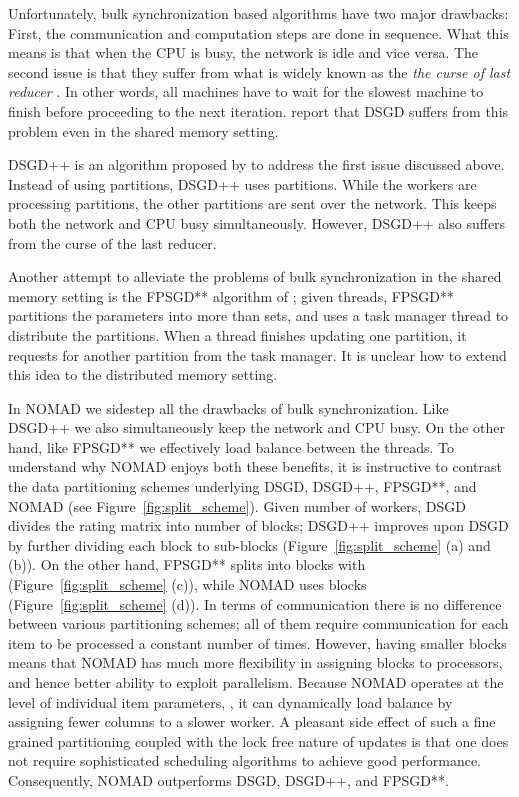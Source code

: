 \documentclass{vldb}
\begin{document}
Unfortunately, bulk synchronization based algorithms have two major
drawbacks: First, the communication and computation steps are done in
sequence. What this means is that when the CPU is busy, the network is
idle and vice versa. The second issue is that they suffer from what is
widely known as the \emph{the curse of last reducer}
\citep{SurVas11,AgaChaDudLan11}. In other words, all machines have to
wait for the slowest machine to finish before proceeding to the next
iteration. \citet{ZhuChiJuaLin13} report that DSGD suffers from this
problem even in the shared memory setting.

DSGD++ is an algorithm proposed by \citet{TefMakGem12} to address the
first issue discussed above. Instead of using  partitions, DSGD++
uses  partitions. While the  workers are processing 
partitions, the other  partitions are sent over the network. This
keeps both the network and CPU busy simultaneously. However, DSGD++
also suffers from the curse of the last reducer. 

Another attempt to alleviate the problems of bulk synchronization in the
shared memory setting is the FPSGD** algorithm of
\citet{ZhuChiJuaLin13}; given  threads, FPSGD** partitions the
parameters into more than  sets, and uses a task manager thread to
distribute the partitions. When a thread finishes updating one
partition, it requests for another partition from the task manager. It
is unclear how to extend this idea to the distributed memory setting.

In NOMAD we sidestep all the drawbacks of bulk synchronization. Like
DSGD++ we also simultaneously keep the network and CPU busy. On the
other hand, like FPSGD** we effectively load balance between the
threads. To understand why NOMAD enjoys both these benefits, it is
instructive to contrast the data partitioning schemes underlying DSGD,
DSGD++, FPSGD**, and NOMAD (see Figure~\ref{fig:split_scheme}).  Given
 number of workers, DSGD divides the rating matrix  into  number of blocks; DSGD++ improves upon DSGD by further
dividing each block to  sub-blocks
(Figure~\ref{fig:split_scheme} (a) and (b)).  On the other hand,
FPSGD** splits  into  blocks with 
(Figure~\ref{fig:split_scheme} (c)), while NOMAD uses 
blocks (Figure~\ref{fig:split_scheme} (d)). In terms of communication
there is no difference between various partitioning schemes; all of
them require  communication for each item to be processed a
constant  number of times. However, having smaller blocks means
that NOMAD has much more flexibility in assigning blocks to
processors, and hence better ability to exploit parallelism. Because
NOMAD operates at the level of individual item parameters, ,
it can dynamically load balance by assigning fewer columns to a slower
worker. A pleasant side effect of such a fine grained partitioning
coupled with the lock free nature of updates is that one does not
require sophisticated scheduling algorithms to achieve good
performance. Consequently, NOMAD outperforms DSGD, DSGD++, and
FPSGD**.
\end{document}
